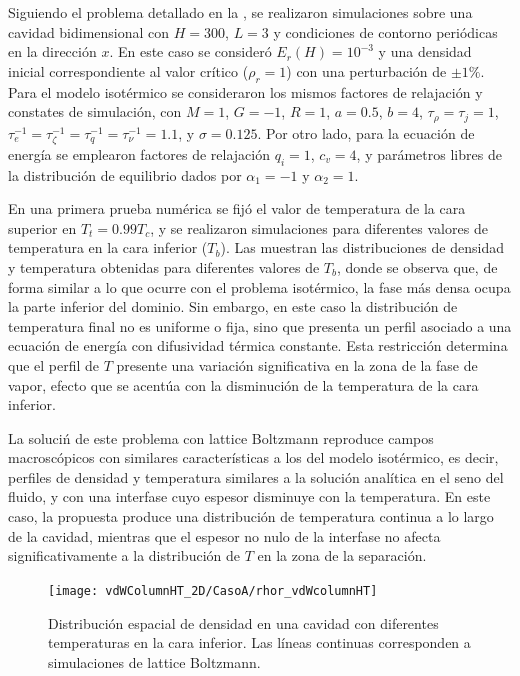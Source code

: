 Siguiendo el problema detallado en la , se realizaron simulaciones sobre  una cavidad bidimensional con $H=300$, $L=3$ y condiciones de contorno peri\'odicas en la direcci\'on $x$. En este caso se consider\'o $E_r(H)=10^{-3}$ y una densidad inicial correspondiente al valor cr\'itico ($\rho_r = 1$) con una perturbaci\'on de $\pm 1 \%$.  Para el modelo isot\'ermico se consideraron los mismos factores de relajaci\'on y constates de simulaci\'on, con $M=1$, $G=-1$, $R=1$, $a=0.5$, $b=4$, $\tau_{\rho} = \tau_j=1$, $\tau_{e}^{-1}=\tau_{\zeta}^{-1}=\tau_{q}^{-1}=\tau_{\nu}^{-1}=1.1$, y $\sigma = 0.125$. Por otro lado, para la ecuaci\'on de energ\'ia se emplearon factores de relajaci\'on $q_i = 1$, $c_v = 4$, y par\'ametros libres de la distribuci\'on de equilibrio dados por $\alpha_1 = -1$ y $\alpha_2 = 1$. 

En una primera prueba num\'erica se fij\'o el valor de temperatura de la cara superior en $T_t = 0.99 T_c$, y se realizaron simulaciones para diferentes valores de temperatura en la cara inferior ($T_b$). Las  muestran las distribuciones de densidad y temperatura obtenidas para diferentes valores de $T_b$, donde se observa que, de forma similar a lo que ocurre con el problema isot\'ermico, la fase m\'as densa ocupa la parte inferior del dominio. Sin embargo, en este caso la distribuci\'on de temperatura final no es uniforme o fija, sino que presenta un perfil asociado a una ecuaci\'on de energ\'ia con difusividad t\'ermica constante. Esta restricci\'on determina que el perfil de $T$ presente una variaci\'on significativa en la zona de la fase de vapor, efecto que se acent\'ua con la disminuci\'on de la temperatura de la cara inferior.

La soluci\'n de este problema con lattice Boltzmann reproduce campos macrosc\'opicos con similares caracter\'isticas a los del modelo isot\'ermico, es decir, perfiles de densidad y temperatura similares a la soluci\'on anal\'itica en el seno del fluido, y con una interfase cuyo espesor disminuye con la temperatura. En este caso, la \lbe{} propuesta produce una distribuci\'on de temperatura continua a lo largo de la cavidad, mientras que el espesor no nulo de la interfase no afecta significativamente a la distribuci\'on de $T$ en la zona de la separaci\'on.

\begin{figure}[ht]
	\centering
	\texttt{[image: vdWColumnHT\_2D/CasoA/rhor\_vdWcolumnHT]}
	\caption{Distribuci\'on espacial de densidad en una cavidad con diferentes temperaturas en la cara inferior. Las l\'ineas continuas corresponden a simulaciones de lattice Boltzmann.}
	\label{fig:vdWColumnHT_rhor}
\end{figure}

